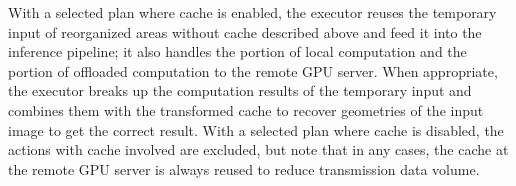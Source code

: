 With a selected plan where cache is enabled, the executor reuses the temporary input of reorganized areas without cache described above and feed it into the inference pipeline; it also handles the portion of local computation and the portion of offloaded computation to the remote GPU server.
When appropriate, the executor breaks up the computation results of the temporary input and combines them with the transformed cache to recover geometries of the input image to get the correct result.
With a selected plan where cache is disabled, the actions with cache involved are excluded, but note that in any cases, the cache at the remote GPU server is always reused to reduce transmission data volume.









